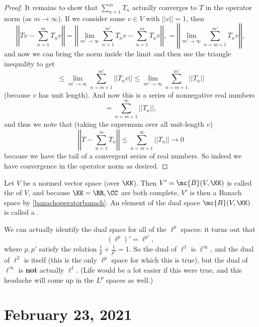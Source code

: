 \begin{proof}
It remains to show that $\sum_{n=1}^m T_n$ actually converges to $T$ in the operator norm (as $m \to \infty$). If we consider some $v \in V$ with $||v|| = 1$, then 
\[
    \boxed{\left|\left|Tv - \sum_{n=1}^m T_n v\right|\right|} = \left|\left| \lim_{m' \to \infty} \sum_{n=1}^{m'} T_n v - \sum_{n=1}^m T_n v\right|\right|, = \left|\left| \lim_{m' \to \infty} \sum_{n = m+1}^{m'} T_n v\right|\right|,
\]
and now we can bring the norm inside the limit and then use the triangle inequality to get
\[
    \le \lim_{m' \to \infty} \sum_{n = m+1}^{m'} ||T_n v|| \le \lim_{m' \to \infty} \boxed{\sum_{n=m+1}^{m'} ||T_n||}
\]
(because $v$ has unit length). And now this is a series of nonnegative real numbers
\[
    = \sum_{n = m+1}^{\infty} ||T_n||,
\]
and thus we note that (taking the supremum over all unit-length $v$)
\[
    \left|\left|T - \sum_{n=1}^m T_n\right|\right| \le \sum_{n = m+1}^{\infty} ||T_n|| \to 0
\]  
because we have the tail of a convergent series of real numbers. So indeed we have convergence in the operator norm as desired.  
\end{proof}

\begin{definition}
Let $V$ be a normed vector space (over $\KK$). Then $V' = \mc{B}(V, \KK)$ is called the  of $V$, and because $\KK = \RR, \CC$ are both complete, $V'$ is then a Banach space by \cref{banachoperatorbanach}. An element of the dual space $\mc{B}(V, \KK)$ is called a .
\end{definition}

We can actually identify the dual space for all of the $\ell^p$ spaces: it turns out that
\[
    (\ell^p)' = \ell^{p'},
\]
where $p, p'$ satisfy the relation $\frac{1}{p} + \frac{1}{p'} = 1$. So the dual of $\ell^1$ is $\ell^{\infty}$, and the dual of $\ell^2$ is itself (this is the only $\ell^p$ space for which this is true), but the dual of $\ell^{\infty}$ is \textbf{not} actually $\ell^1$. (Life would be a lot easier if this were true, and this headache will come up in the $L^p$ spaces as well.)


\pagebreak\section*{February 23, 2021}

